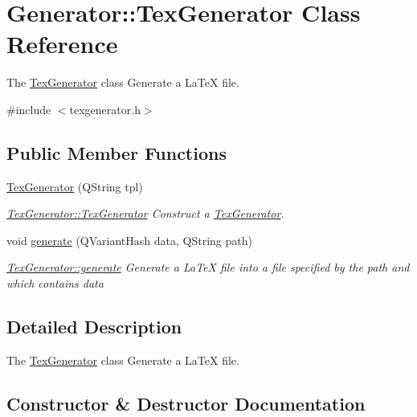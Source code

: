 \hypertarget{classGenerator_1_1TexGenerator}{}\section{Generator\+:\+:Tex\+Generator Class Reference}
\label{classGenerator_1_1TexGenerator}


The \hyperlink{classGenerator_1_1TexGenerator}{Tex\+Generator} class Generate a La\+Te\+X file.  




{\ttfamily \#include $<$texgenerator.\+h$>$}

\subsection*{Public Member Functions}
\begin{DoxyCompactItemize}
\item 
\hyperlink{classGenerator_1_1TexGenerator_ade851f7c789f66769bbdace3c4a37eef}{Tex\+Generator} (Q\+String tpl)
\begin{DoxyCompactList}\small\item\em \hyperlink{classGenerator_1_1TexGenerator_ade851f7c789f66769bbdace3c4a37eef}{Tex\+Generator\+::\+Tex\+Generator} Construct a \hyperlink{classGenerator_1_1TexGenerator}{Tex\+Generator}. \end{DoxyCompactList}\item 
void \hyperlink{classGenerator_1_1TexGenerator_a5862fde82e703176d1cdaa33d3ac3db5}{generate} (Q\+Variant\+Hash data, Q\+String path)
\begin{DoxyCompactList}\small\item\em \hyperlink{classGenerator_1_1TexGenerator_a5862fde82e703176d1cdaa33d3ac3db5}{Tex\+Generator\+::generate} Generate a La\+Te\+X file into a file specified by the {\itshape path} and which contains {\itshape data} \end{DoxyCompactList}\end{DoxyCompactItemize}


\subsection{Detailed Description}
The \hyperlink{classGenerator_1_1TexGenerator}{Tex\+Generator} class Generate a La\+Te\+X file. 

\subsection{Constructor \& Destructor Documentation}
\hypertarget{classGenerator_1_1TexGenerator_ade851f7c789f66769bbdace3c4a37eef}{}
